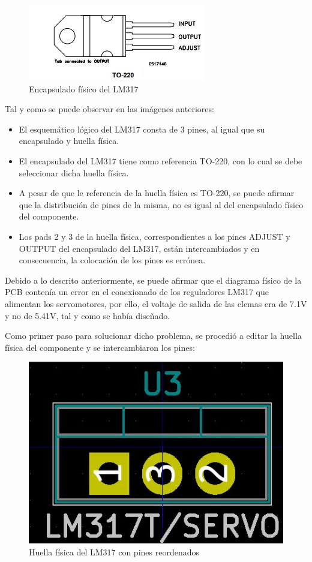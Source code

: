 \begin{itemize}
    \begin{figure}[H]
    \centering 
    \includegraphics[width=0.65\linewidth]{pictures/FailPinout.JPG}
    \caption{Encapsulado físico del LM317}
    \label{fig:kdiagram}
    \end{figure}
    
    Tal y como se puede observar en las imágenes anteriores:
    
    \begin{itemize}
    
        \item El esquemático lógico del LM317 consta de 3 pines, al igual que su encapsulado y huella física.
        
        \item El encapsulado del LM317 tiene como referencia TO-220, con lo cual se debe seleccionar dicha huella física.
        
        \item A pesar de que le referencia de la huella física es TO-220, se puede afirmar que la distribución de pines de la misma, no es igual al del encapsulado físico del componente.
        
        \item Los pads 2 y 3 de la huella física, correspondientes a los pines ADJUST y OUTPUT del encapsulado del LM317, están intercambiados y en consecuencia, la colocación de los pines es errónea.
        
    \end{itemize}
    
    Debido a lo descrito anteriormente, se puede afirmar que el diagrama físico de la \ac{PCB} contenía un error en el conexionado de los reguladores LM317 que alimentan los servomotores, por ello, el voltaje de salida de las clemas era de 7.1V y no de 5.41V, tal y como se había diseñado.
    
    Como primer paso para solucionar dicho problema, se procedió a editar la huella física del componente y se intercambiaron los pines:
    
    \begin{figure}[H]
    \centering 
    \includegraphics[width=0.45\linewidth]{pictures/FixedLM.JPG}
    \caption{Huella física del LM317 con pines reordenados}
    \label{fig:kdiagram}
    \end{figure}
    

\end{itemize}
